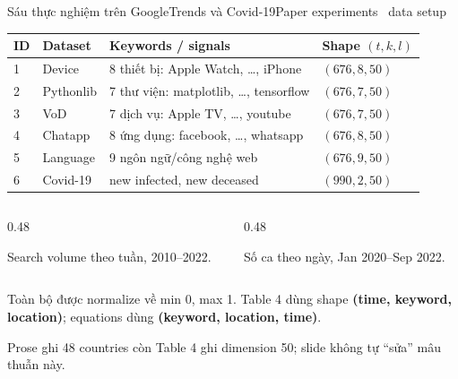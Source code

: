 \begin{frame}[shrink=33]{Sáu thực nghiệm trên GoogleTrends và Covid-19}{Paper experiments \textperiodcentered\ data setup}
\centering
{\small
\begin{tabular}{@{}llp{7.0cm}l@{}}
  \toprule
  ID & Dataset & Keywords / signals & Shape $(t,k,l)$\\
  \midrule
  1 & Device & 8 thiết bị: Apple Watch, \ldots, iPhone & $(676,8,50)$\\
  2 & Pythonlib & 7 thư viện: matplotlib, \ldots, tensorflow & $(676,7,50)$\\
  3 & VoD & 7 dịch vụ: Apple TV, \ldots, youtube & $(676,7,50)$\\
  4 & Chatapp & 8 ứng dụng: facebook, \ldots, whatsapp & $(676,8,50)$\\
  5 & Language & 9 ngôn ngữ/công nghệ web & $(676,9,50)$\\
  6 & Covid-19 & new infected, new deceased & $(990,2,50)$\\
  \bottomrule
\end{tabular}}
\vspace{4mm}
\begin{columns}[T,onlytextwidth]
\begin{column}{0.48\textwidth}
\begin{intuition}[GoogleTrends]
  Search volume theo tuần, 2010--2022.
\end{intuition}
\end{column}
\begin{column}{0.48\textwidth}
\begin{mathcard}[Covid-19]
  Số ca theo ngày, Jan 2020--Sep 2022.
\end{mathcard}
\end{column}
\end{columns}
\vspace{3mm}
\begin{questioncard}
  Toàn bộ được normalize về min 0, max 1. Table 4 dùng shape \textbf{(time, keyword, location)}; equations dùng \textbf{(keyword, location, time)}.
\end{questioncard}
\vspace{2mm}
\begin{caution}
  Prose ghi 48 countries còn Table 4 ghi dimension 50; slide không tự “sửa” mâu thuẫn này.
\end{caution}
\vspace{1mm}
\end{frame}

